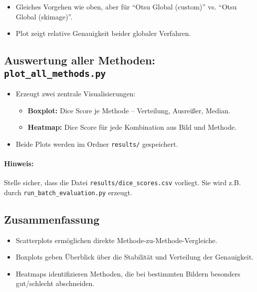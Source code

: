 \documentclass[a4paper,12pt]{article}
\begin{document}
\begin{itemize}
    \item Gleiches Vorgehen wie oben, aber für ``Otsu Global (custom)'' vs. ``Otsu Global (skimage)''.
    \item Plot zeigt relative Genauigkeit beider globaler Verfahren.
\end{itemize}

\vspace{1em}
\subsection{Auswertung aller Methoden: \texttt{plot\_all\_methods.py}}

\begin{itemize}
    \item Erzeugt zwei zentrale Visualisierungen:
    \begin{itemize}
        \item \textbf{Boxplot:} Dice Score je Methode – Verteilung, Ausreißer, Median.
        \item \textbf{Heatmap:} Dice Score für jede Kombination aus Bild und Methode.
    \end{itemize}
    \item Beide Plots werden im Ordner \texttt{results/} gespeichert.
\end{itemize}

\paragraph{Hinweis:} Stelle sicher, dass die Datei \texttt{results/dice\_scores.csv} vorliegt. Sie wird z.B. durch \texttt{run\_batch\_evaluation.py} erzeugt.

\vspace{1em}
\subsection{Zusammenfassung}

\begin{itemize}
    \item Scatterplots ermöglichen direkte Methode-zu-Methode-Vergleiche.
    \item Boxplots geben Überblick über die Stabilität und Verteilung der Genauigkeit.
    \item Heatmaps identifizieren Methoden, die bei bestimmten Bildern besonders gut/schlecht abschneiden.
\end{itemize}
\end{document}
